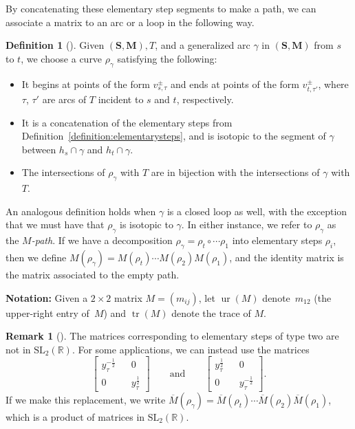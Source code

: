 \documentclass[10pt,a4paper]{amsart}
\numberwithin{equation}{section}
\theoremstyle{definition}
\newtheorem{Definition}[Theorem]{Definition}
\newtheorem{Remark}[Theorem]{Remark}
\newcommand{\SM}{(\mathbf{S}, \mathbf{M})}
\begin{document}
By concatenating these elementary step segments to make a path, we can associate a matrix to an arc or a loop in the following way.

\begin{Definition}[{\cite{MW13}}]
Given $\SM, T$, and a generalized arc $\gamma$ in $\SM$ from $s$ to $t$, we choose a curve $\rho_{\gamma}$ satisfying the following:
\begin{itemize}\itemsep=0pt
\item It begins at points of the form $v^{\pm}_{s, \tau}$ and ends at points of the form $v^{\pm}_{t, \tau'}$, where $\tau$, $\tau'$ are arcs of $T$ incident to $s$ and $t$, respectively.
\item It is a concatenation of the elementary steps from Definition~\ref{definition:elementarysteps}, and is isotopic to the segment of $\gamma$ between $h_s\cap \gamma$ and $h_t\cap \gamma$.
\item The intersections of $\rho_{\gamma}$ with $T$ are in bijection with the intersections of $\gamma$ with $T$.
\end{itemize}
An analogous definition holds when $\gamma$ is a closed loop as well, with the exception that we must have that $\rho_{\gamma}$ is isotopic to $\gamma$. In either instance, we refer to $\rho_{\gamma}$ as the \textit{$M$-path}. If we have a decomposition $\rho_{\gamma}=\rho_t\circ\cdots \rho_1$ into elementary steps $\rho_i$, then we define $M(\rho_{\gamma})=M(\rho_{t})\cdots M(\rho_{2})M(\rho_{1})$, and the identity matrix is the matrix associated to the empty path.
\end{Definition}

\noindent \textbf{Notation:}
Given a $2\times 2$ matrix $M=(m_{ij})$, let $\operatorname{ur}(M)$ denote~$m_{12}$ (the upper-right entry of~$M$) and $\operatorname{tr}(M)$ denote the trace of $M$.


\begin{Remark}[\cite{MW13}]
The matrices corresponding to elementary steps of type two are not in $\text{SL}_2(\mathbb{R})$. For some applications, we can instead use the matrices
\[\begin{bmatrix}
 y_{\tau}^{-\frac{1}{2}} && 0\\
 0 && y_{\tau}^{\frac{1}{2}}
\end{bmatrix}\qquad\text{and}\qquad
\begin{bmatrix}
 y_{\tau}^{\frac{1}{2}} && 0\\
 0 && y_{\tau}^{-\frac{1}{2}}
\end{bmatrix}.\]
If we make this replacement, we write $\overline{M}(\rho_{\gamma})=\overline{M}(\rho_{t})\cdots \overline{M}(\rho_{2})\overline{M}(\rho_{1})$, which is a product of matrices in $\text{SL}_2(\mathbb{R})$.
\end{Remark}
\end{document}
